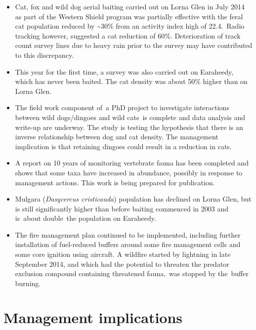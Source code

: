 \documentclass[version=last,
    paper=a4, %
    10pt, %
    usenames,
    dvipsnames,
    oneside, %
    headings=openany, %
    DIV=15 %
]{scrbook}
\begin{document}
\begin{itemize}
\itemsep1pt\parskip0pt
\item
  Cat, fox and wild dog aerial baiting carried out on Lorna Glen in July
  2014 as part of the Western Shield program was partially effective
  with the feral cat population reduced by \textasciitilde{}30\% from an
  activity index high of 22.4.~Radio tracking however, suggested a cat
  reduction of 60\%. Deterioration of track count survey lines due to
  heavy rain prior to the survey may have contributed to this
  discrepancy.~~
\item
  This year for the first time, a survey was also carried out on
  Earaheedy, which has never been baited. The cat density was about 50\%
  higher than on Lorna Glen.~
\item
  The field work component of~a PhD project to investigate interactions
  between wild dogs/dingoes and wild cats~is complete and data analysis
  and write-up are underway. The study is testing the hypothesis that
  there is an inverse relationship between dog and cat density. The
  management implication is that retaining dingoes could result in a
  reduction in cats.
\item
  A report on 10 years of monitoring vertebrate fauna has been completed
  and shows that some taxa have increased in abundance, possibly in
  response to management actions. This work is being prepared for
  publication.
\item
  Mulgara (\emph{Dasycercus cristicauda}) population has declined on
  Lorna Glen, but is still significantly higher than before baiting
  commenced in 2003 and is~about double~the population on Earaheedy.
\item
  The fire management plan continued to be implemented, including
  further installation of fuel-reduced buffers around some fire
  management cells and some core ignition using aircraft. A wildfire
  started by lightning in late September 2014, and which had the
  potential to threaten the predator exclusion compound containing
  threatened fauna,~was stopped by the~buffer burning.
\end{itemize}




\section*{Management implications}
\end{document}
